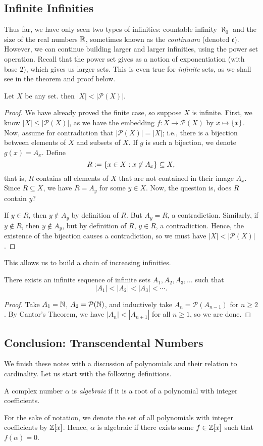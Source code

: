 \documentclass{article}
\begin{document}
\subsection*{Infinite Infinities}
Thus far, we have only seen two types of infinities: countable infinity $\aleph_0$ and the size of the real numbers $\mathbb R$, sometimes known as the \textit{continuum} (denoted $\mathfrak c$). However, we can continue building larger and larger infinities, using the power set operation. Recall that the power set gives as a notion of exponentiation (with base $2$), which gives us larger sets. This is even true for \textit{infinite} sets, as we shall see in the theorem and proof below.
\begin{theorem}
Let $X$ be any set. then $|X| < |\mathcal P(X)|$.
\end{theorem}
\begin{proof}
We have already proved the finite case, so suppose $X$ is infinite. First, we know $|X| \leq |\mathcal P(X)|$, as we have the embedding $f: X \to \mathcal P(X)$ by $x\mapsto \left\{x\right\}$. Now, assume for contradiction that $|\mathcal P(X)| = |X|$; i.e., there is a bijection between elements of $X$ and subsets of $X$. If $g$ is such a bijection, we denote $g(x) = A_x$. Define
$$R := \left\{x\in X: x\not\in A_x\right\}\subseteq X,$$
that is, $R$ contains all elements of $X$ that are not contained in their image $A_x$. Since $R\subseteq X$, we have $R = A_y$ for some $y\in X$. Now, the question is, does $R$ contain $y$?

If $y\in R$, then $y\not\in A_y$ by definition of $R$. But $A_y = R$, a contradiction. Similarly, if $y\not\in R$, then $y\not\in A_y$, but by definition of $R$, $y\in R$, a contradiction. Hence, the existence of the bijection causes a contradiction, so we must have $|X| < |\mathcal P(X)|$.
\end{proof}
\newpage
This allows us to build a chain of increasing infinities.
\begin{corollary}
There exists an infinite sequence of infinite sets $A_1, A_2, A_3, \ldots$ such that $$|A_1| < |A_2| < |A_3| < \cdots.$$
\end{corollary}
\begin{proof}
Take $A_1 = \mathbb N$, $A_2 = \mathcal P(\mathbb N)$, and inductively take $A_n = \mathcal P(A_{n-1})$ for $n\geq 2$. By Cantor's Theorem, we have $|A_n| < |A_{n+1}|$ for all $n\geq 1$, so we are done.
\end{proof}

\subsection*{Conclusion: Transcendental Numbers}
We finish these notes with a discussion of polynomials and their relation to cardinality. Let us start with the following definitions.
\begin{definition}
A complex number $\alpha$ is \textit{algebraic} if it is a root of a polynomial with integer coefficients. 
\end{definition}
For the sake of notation, we denote the set of all polynomials with integer coefficients by $\mathbb Z[x]$. Hence, $\alpha$ is algebraic if there exists some $f\in \mathbb Z[x]$ such that $f(\alpha) = 0$.
\end{document}
